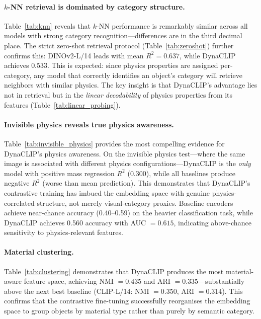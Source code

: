 \documentclass{article}
\newcommand{\methodname}{DynaCLIP}
\begin{document}
\paragraph{$k$-NN retrieval is dominated by category structure.}
Table~\ref{tab:knn} reveals that $k$-NN performance is remarkably similar across all models with strong category recognition---differences are in the third decimal place. The strict zero-shot retrieval protocol (Table~\ref{tab:zeroshot}) further confirms this: DINOv2-L/14 leads with mean $R^2{=}0.637$, while \methodname{} achieves $0.533$. This is expected: since physics properties are assigned per-category, any model that correctly identifies an object's category will retrieve neighbors with similar physics. The key insight is that \methodname{}'s advantage lies not in retrieval but in the \emph{linear decodability} of physics properties from its features (Table~\ref{tab:linear_probing}).

\paragraph{Invisible physics reveals true physics awareness.}
Table~\ref{tab:invisible_physics} provides the most compelling evidence for \methodname{}'s physics awareness. On the invisible physics test---where the same image is associated with different physics configurations---\methodname{} is the \emph{only} model with positive mass regression $R^2$ ($0.300$), while all baselines produce negative $R^2$ (worse than mean prediction). This demonstrates that \methodname{}'s contrastive training has imbued the embedding space with genuine physics-correlated structure, not merely visual-category proxies. Baseline encoders achieve near-chance accuracy (0.40--0.59) on the heavier classification task, while \methodname{} achieves 0.560 accuracy with AUC $= 0.615$, indicating above-chance sensitivity to physics-relevant features.

\paragraph{Material clustering.}
Table~\ref{tab:clustering} demonstrates that \methodname{} produces the most material-aware feature space, achieving NMI $= 0.435$ and ARI $= 0.335$---substantially above the next best baseline (CLIP-L/14: NMI $= 0.350$, ARI $= 0.314$). This confirms that the contrastive fine-tuning successfully reorganises the embedding space to group objects by material type rather than purely by semantic category.
\end{document}
